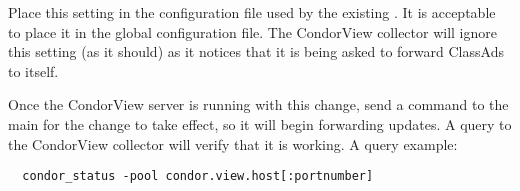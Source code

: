 Place this setting in the configuration file used by the existing 
.
It is acceptable to place it in the global configuration file.  The
CondorView collector will ignore this setting (as it should) as it notices
that it is being asked to forward ClassAds to itself.

Once the CondorView server is running with this 
change, send a
 command to the main  for the change to
take effect, so it will begin forwarding updates.  
A query to the CondorView collector will verify that it is working.
A query example:

\footnotesize
\begin{verbatim}
  condor_status -pool condor.view.host[:portnumber]
\end{verbatim}
\normalsize
